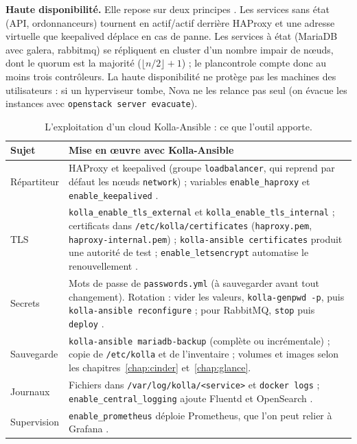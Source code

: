\textbf{Haute disponibilité.} Elle repose sur deux principes \parencite{ha-concepts}. Les services sans état (API, ordonnanceurs)
tournent en actif/actif derrière HAProxy et une adresse virtuelle que \gls{keepalived} déplace en cas de panne. Les services à état
(MariaDB avec \gls{galera}, \gls{rabbitmq}) se répliquent en cluster d'un nombre impair de nœuds, dont le quorum est la majorité
(\(\lfloor n/2\rfloor+1\)) ; le \gls{plancontrole} compte donc au moins trois contrôleurs. La haute disponibilité ne protège pas
les machines des utilisateurs : si un hyperviseur tombe, Nova ne les relance pas seul (on évacue les instances avec
\texttt{openstack server evacuate}).

\begin{table}[!ht]
\centering
\renewcommand{\arraystretch}{1.25}
\small
\begin{tabular}{@{}>{\raggedright\arraybackslash}p{2.3cm}>{\raggedright\arraybackslash}p{13.1cm}@{}}
\toprule
\textbf{Sujet} & \textbf{Mise en œuvre avec Kolla-Ansible} \\
\midrule
Répartiteur & HAProxy et keepalived (groupe \texttt{loadbalancer}, qui reprend par défaut les nœuds \texttt{network}) ; variables \texttt{enable\_haproxy} et \texttt{enable\_keepalived} \parencite{kolla-ansible-haproxy}. \\
TLS & \texttt{kolla\_enable\_tls\_external} et \texttt{kolla\_enable\_tls\_internal} ; certificats dans \texttt{/etc/kolla/certificates} (\texttt{haproxy.pem}, \texttt{haproxy-internal.pem}) ; \texttt{kolla-ansible certificates} produit une autorité de test ; \texttt{enable\_letsencrypt} automatise le renouvellement \parencite{kolla-ansible-tls}. \\
Secrets & Mots de passe de \texttt{passwords.yml} (à sauvegarder avant tout changement). Rotation : vider les valeurs, \texttt{kolla-genpwd -p}, puis \texttt{kolla-ansible reconfigure} ; pour RabbitMQ, \texttt{stop} puis \texttt{deploy} \parencite{kolla-ansible-passwords}. \\
Sauvegarde & \texttt{kolla-ansible mariadb-backup} (complète ou incrémentale) \parencite{kolla-ansible-mariadb-backup} ; copie de \texttt{/etc/kolla} et de l'inventaire ; volumes et images selon les chapitres~\ref{chap:cinder} et~\ref{chap:glance}. \\
Journaux & Fichiers dans \texttt{/var/log/kolla/<service>} et \texttt{docker logs} ; \texttt{enable\_central\_logging} ajoute Fluentd et OpenSearch \parencite{kolla-ansible-troubleshooting,kolla-ansible-logging}. \\
Supervision & \texttt{enable\_prometheus} déploie Prometheus, que l'on peut relier à Grafana \parencite{kolla-ansible-prometheus}. \\
\bottomrule
\end{tabular}
\caption{L'exploitation d'un cloud Kolla-Ansible : ce que l'outil apporte.}
\label{tab:dep-exploit}
\end{table}

